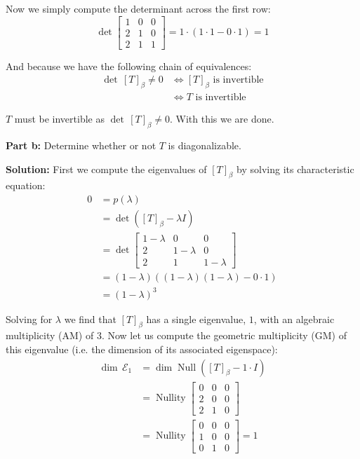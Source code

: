 \documentclass{article}
\begin{document}
Now we simply compute the determinant across the first row:
$$\operatorname{det}\begin{bmatrix}
  1&0&0\\2&1&0\\2&1&1
\end{bmatrix}=1\cdot(1\cdot1-0\cdot1)=1$$

And because we have the following chain of equivalences:
\begin{align*}
  \operatorname{det}\,[T]_\beta\not=0&\iff[T]_\beta\text{ is invertible}\\
  &\iff T\text{ is invertible}
\end{align*}

$T$ must be invertible as $\operatorname{det}\,[T]_\beta\not=0$. With this we are done.
\bigskip
\newpage

\noindent\textbf{Part b:} Determine whether or not $T$ is diagonalizable.
\bigskip

\noindent\textbf{Solution:} First we compute the eigenvalues of $[T]_\beta$ by solving its characteristic equation:
\begin{align*}
  0&=p(\lambda)\\
  &=\operatorname{det}([T]_\beta-\lambda I)\\
  &=\operatorname{det}\begin{bmatrix}
    1-\lambda&0&0\\2&1-\lambda&0\\2&1&1-\lambda
  \end{bmatrix}\\
  &=(1-\lambda)((1-\lambda)(1-\lambda)-0\cdot1)\\
  &=(1-\lambda)^3
\end{align*}

Solving for $\lambda$ we find that $[T]_\beta$ has a single eigenvalue, $1$, with an algebraic multiplicity (AM) of 3. Now let us compute the geometric multiplicity (GM) of this eigenvalue (i.e. the dimension of its associated eigenspace):
\begin{align*}
  \operatorname{dim}\,\mathcal E_1&=\operatorname{dim}\operatorname{Null}([T]_\beta-1\cdot I)\tag{def. of eigenspace}\\
  &=\operatorname{Nullity}\begin{bmatrix}
    0&0&0\\2&0&0\\2&1&0
  \end{bmatrix}\tag{dim of nullspace = nullity}\\
  &=\operatorname{Nullity}\begin{bmatrix}
    0&0&0\\1&0&0\\0&1&0
  \end{bmatrix}=1\tag{row operations preserve nullspace}
\end{align*}
\end{document}
